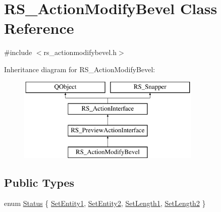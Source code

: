 \hypertarget{classRS__ActionModifyBevel}{\section{R\-S\-\_\-\-Action\-Modify\-Bevel Class Reference}
\label{classRS__ActionModifyBevel}
}


{\ttfamily \#include $<$rs\-\_\-actionmodifybevel.\-h$>$}

Inheritance diagram for R\-S\-\_\-\-Action\-Modify\-Bevel\-:\begin{figure}[H]
\begin{center}
\leavevmode
\includegraphics[height=4.000000cm]{classRS__ActionModifyBevel}
\end{center}
\end{figure}
\subsection*{Public Types}
\begin{DoxyCompactItemize}
\item 
enum \hyperlink{classRS__ActionModifyBevel_a695143d8b22ff3f4d565cdb0e0663b1d}{Status} \{ \hyperlink{classRS__ActionModifyBevel_a695143d8b22ff3f4d565cdb0e0663b1da3621ccbf9a8cbb825c025e49aa777b33}{Set\-Entity1}, 
\hyperlink{classRS__ActionModifyBevel_a695143d8b22ff3f4d565cdb0e0663b1dab634551b9d88d1d58af14835ae1310be}{Set\-Entity2}, 
\hyperlink{classRS__ActionModifyBevel_a695143d8b22ff3f4d565cdb0e0663b1da7784af9a47eb6e6b79b04e8d66d4dd29}{Set\-Length1}, 
\hyperlink{classRS__ActionModifyBevel_a695143d8b22ff3f4d565cdb0e0663b1da65db25def706ab42262ed4fe9c8f24c2}{Set\-Length2}
 \}
\end{DoxyCompactItemize}
